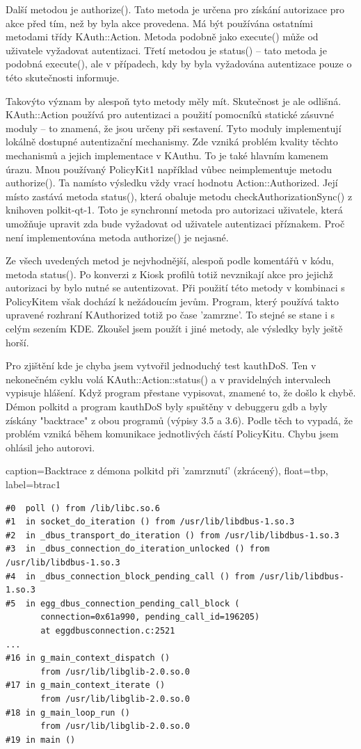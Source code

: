 Další metodou je authorize(). Tato metoda je určena pro získání autorizace pro
akce před tím, než by byla akce provedena. Má být používána ostatními metodami
třídy KAuth::Action.  Metoda podobně jako execute() může od uživatele vyžadovat
autentizaci. Třetí metodou je status() -- tato metoda je podobná execute(),
 ale v případech, kdy by byla vyžadována autentizace pouze o této skutečnosti
informuje.

Takovýto význam by alespoň tyto metody měly mít. Skutečnost je ale odlišná.
KAuth::Action používá pro autentizaci a použití pomocníků statické zásuvné
moduly -- to znamená, že jsou určeny při sestavení. Tyto moduly implementují
lokálně dostupné autentizační mechanismy. Zde vzniká problém kvality těchto
mechanismů a jejich implementace v KAuthu. To je také hlavním kamenem úrazu.
Mnou používaný PolicyKit1 například vůbec neimplementuje metodu authorize().
Ta namísto výsledku vždy vrací hodnotu Action::Authorized. Její místo zastává
metoda status(), která obaluje metodu checkAuthorizationSync() z knihoven
polkit-qt-1. Toto je synchronní metoda pro autorizaci uživatele, která umožňuje
upravit zda bude vyžadovat od uživatele autentizaci příznakem. Proč není
implementována metoda authorize() je nejasné.

Ze všech uvedených metod je nejvhodnější, alespoň podle komentářů v kódu, metoda
status(). Po konverzi z Kiosk profilů totiž nevznikají akce pro jejichž
autorizaci by bylo nutné se autentizovat. Při použití této metody v kombinaci
s PolicyKitem však dochází k nežádoucím jevům. Program, který používá takto
upravené rozhraní KAuthorized totiž po čase 'zamrzne'. To stejné se stane
i s celým sezením KDE. Zkoušel jsem použít i jiné metody, ale výsledky byly
ještě horší.

Pro zjištění kde je chyba jsem vytvořil jednoduchý test kauthDoS. Ten
v nekonečném cyklu volá KAuth::Action::status() a v pravidelných intervalech
vypisuje hlášení. Když program přestane vypisovat, znamené to, že došlo k chybě.
Démon polkitd a program kauthDoS byly spuštěny v debuggeru gdb a byly získány
"backtrace" z obou programů (výpisy 3.5 a 3.6). Podle těch
to vypadá, že problém vzniká během komunikace jednotlivých částí PolicyKitu.
Chybu jsem ohlásil jeho autorovi.

\lstset
{
    caption=Backtrace z démona polkitd při 'zamrznutí' (zkrácený),
    float=tbp,
    label=btrac1
}
\begin{lstlisting}
#0  poll () from /lib/libc.so.6
#1  in socket_do_iteration () from /usr/lib/libdbus-1.so.3
#2  in _dbus_transport_do_iteration () from /usr/lib/libdbus-1.so.3
#3  in _dbus_connection_do_iteration_unlocked () from /usr/lib/libdbus-1.so.3
#4  in _dbus_connection_block_pending_call () from /usr/lib/libdbus-1.so.3
#5  in egg_dbus_connection_pending_call_block (
       connection=0x61a990, pending_call_id=196205)
       at eggdbusconnection.c:2521
...      
#16 in g_main_context_dispatch ()
       from /usr/lib/libglib-2.0.so.0
#17 in g_main_context_iterate ()
       from /usr/lib/libglib-2.0.so.0
#18 in g_main_loop_run ()
       from /usr/lib/libglib-2.0.so.0
#19 in main ()
\end{lstlisting}

